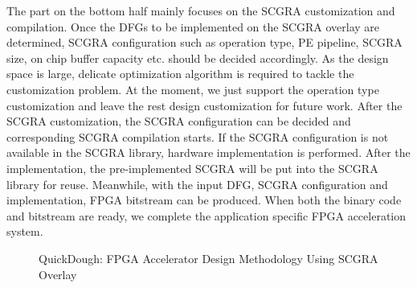 The part on the bottom half mainly focuses on the SCGRA customization and compilation. Once the DFGs to be implemented on the SCGRA overlay are determined, SCGRA configuration such as operation type, PE pipeline, SCGRA size, on chip buffer capacity etc. should be decided accordingly. As the design space is large, delicate optimization algorithm is required to tackle the customization problem. At the moment, we just support the operation type customization and leave the rest design customization for future work. After the SCGRA customization, the SCGRA configuration can be decided and corresponding SCGRA compilation starts. If the SCGRA configuration is not available in the SCGRA library, hardware implementation is performed. After the implementation, the pre-implemented SCGRA will be put into the SCGRA library for reuse. Meanwhile, with the input DFG, SCGRA configuration and implementation, FPGA bitstream can be produced. When both the binary code and bitstream are ready, we complete the application specific FPGA acceleration system. 

\begin{figure}[H]
    \caption{QuickDough: FPGA Accelerator Design Methodology Using SCGRA Overlay}
    \label{fig:framework}
\end{figure}

